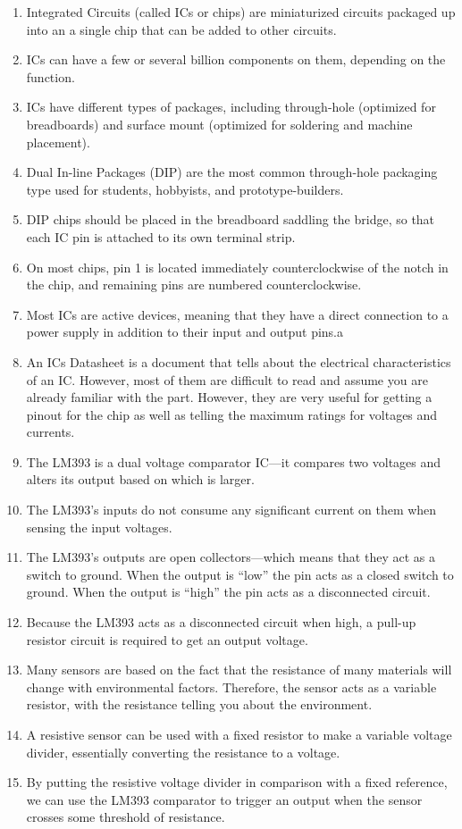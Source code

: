 \begin{enumerate}
\item Integrated Circuits (called ICs or chips) are miniaturized circuits packaged up into an a single chip that can be added to other circuits.
\item ICs can have a few or several billion components on them, depending on the function.
\item ICs have different types of packages, including through-hole (optimized for breadboards) and surface mount (optimized for soldering and machine placement).
\item Dual In-line Packages (DIP) are the most common through-hole packaging type used for students, hobbyists, and prototype-builders.
\item DIP chips should be placed in the breadboard saddling the bridge, so that each IC pin is attached to its own terminal strip.
\item On most chips, pin 1 is located immediately counterclockwise of the notch in the chip, and remaining pins are numbered counterclockwise.
\item Most ICs are active devices, meaning that they have a direct connection to a power supply in addition to their input and output pins.a
\item An ICs Datasheet is a document that tells about the electrical characteristics of an IC.  However, most of them are difficult to read and assume you are already familiar with the part.  However, they are very useful for getting a pinout for the chip as well as telling the maximum ratings for voltages and currents.
\item The LM393 is a dual voltage comparator IC---it compares two voltages and alters its output based on which is larger.
\item The LM393's inputs do not consume any significant current on them when sensing the input voltages.
\item The LM393's outputs are open collectors---which means that they act as a switch to ground.  When the output is ``low'' the pin acts as a closed switch to ground.  When the output is ``high'' the pin acts as a disconnected circuit.
\item Because the LM393 acts as a disconnected circuit when high, a pull-up resistor circuit is required to get an output voltage.
\item Many sensors are based on the fact that the resistance of many materials will change with environmental factors.  Therefore, the sensor acts as a variable resistor, with the resistance telling you about the environment.
\item A resistive sensor can be used with a fixed resistor to make a variable voltage divider, essentially converting the resistance to a voltage.
\item By putting the resistive voltage divider in comparison with a fixed reference, we can use the LM393 comparator to trigger an output when the sensor crosses some threshold of resistance.
\end{enumerate}

\applysection


